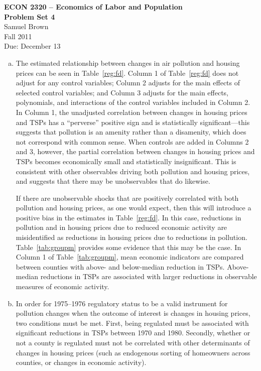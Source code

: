 \documentclass{article}
\begin{document}
\begin{center}
\textbf{ECON 2320 -- Economics of Labor and Population} \\
\textbf{Problem Set 4} \\
Samuel Brown \\
Fall 2011 \\
Due: December 13

\end{center}
\bigskip

\arraycolsep 1pt

\begin{enumerate}[(a)]

\item The estimated relationship between changes in air pollution and housing prices can be seen in Table~\ref{reg:fd}. Column 1 of Table~\ref{reg:fd} does not adjust for any control variables; Column 2 adjusts for the main effects of selected control variables; and Column 3 adjusts for the main effects, polynomials, and interactions of the control variables included in Column 2. In Column 1, the unadjusted correlation between changes in housing prices and TSPs has a ``perverse'' positive sign and is statistically significant---this suggests that pollution is an amenity rather than a disamenity, which does not correspond with common sense. When controls are added in Columns 2 and 3, however, the partial correlation  between changes in housing prices and TSPs becomes economically small and statistically insignificant. This is consistent with other observables driving both pollution and housing prices, and suggests that there may be unobservables that do likewise.



If there are unobservable shocks that are positively correlated with both pollution and housing prices, as one would expect, then this will introduce a positive bias in the estimates in Table~\ref{reg:fd}. In this case, reductions in pollution and in housing prices due to reduced economic activity are misidentified as reductions in housing prices due to reductions in pollution. Table~\ref{tab:groupm} provides some evidence that this may be the case. In Column 1 of Table~\ref{tab:groupm}, mean economic indicators are compared between counties with above- and below-median reduction in TSPs. Above-median reductions in TSPs are associated with larger reductions in observable measures of economic activity.



\item In order for 1975--1976 regulatory status to be a valid instrument for pollution changes when the outcome of interest is changes in housing prices, two conditions must be met. First, being regulated must be associated with significant reductions in TSPs between 1970 and 1980. Secondly, whether or not a county is regulated must not be correlated with other determinants of changes in housing prices (such as endogenous sorting of homeowners across counties, or changes in economic activity).


\end{enumerate}
\end{document}
